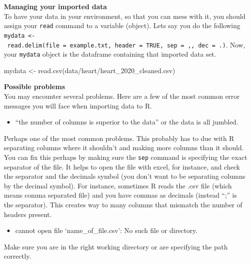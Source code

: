 \documentclass[
]{book}
\newenvironment{Shaded}{\begin{snugshade}}{\end{snugshade}}
\newcommand{\FunctionTok}[1]{\textcolor[rgb]{0.00,0.00,0.00}{#1}}
\newcommand{\NormalTok}[1]{#1}
\newcommand{\OtherTok}[1]{\textcolor[rgb]{0.56,0.35,0.01}{#1}}
\newcommand{\StringTok}[1]{\textcolor[rgb]{0.31,0.60,0.02}{#1}}
\providecommand{\tightlist}{%
  \setlength{\itemsep}{0pt}\setlength{\parskip}{0pt}}
\begin{document}
\textbf{Managing your imported data}\\
To have your data in your environment, so that you can mess with it, you should assign your \texttt{read} command to a variable (object).
Lets say you do the following \texttt{mydata\ \textless{}-\ read.delim(file\ =\ \textquotesingle{}example.txt\textquotesingle{},\ header\ =\ TRUE,\ sep\ =\ \textquotesingle{},\textquotesingle{},\ dec\ =\ \textquotesingle{}.\textquotesingle{})}.
Now, your \texttt{mydata} object is the dataframe containing that imported data set.

\begin{Shaded}
\begin{Highlighting}[]
\NormalTok{mydata }\OtherTok{\textless{}{-}} \FunctionTok{read.csv}\NormalTok{(}\StringTok{\textquotesingle{}data/heart/heart\_2020\_cleaned.csv\textquotesingle{}}\NormalTok{)}
\end{Highlighting}
\end{Shaded}

\textbf{Possible problems}\\
You may encounter several problems.
Here are a few of the most common error messages you will face when importing data to R.

\begin{itemize}
\tightlist
\item
  ``the number of columns is superior to the data'' or the data is all jumbled.
\end{itemize}

Perhaps one of the most common problems.
This probably has to due with R separating columns where it shouldn't and making more columns than it should.
You can fix this perhaps by making sure the \texttt{sep} command is specifying the exact separator of the file.
It helps to open the file with excel, for instance, and check the separator and the decimals symbol (you don't want to be separating columns by the decimal symbol).
For instance, sometimes R reads the .csv file (which means comma separated file) and you have commas as decimals (instead ``;'' is the separator).
This creates way to many columns that mismatch the number of headers present.

\begin{itemize}
\tightlist
\item
  cannot open file `name\_of\_file.csv': No such file or directory.
\end{itemize}

Make sure you are in the right working directory or are specifying the path correctly.
\end{document}
